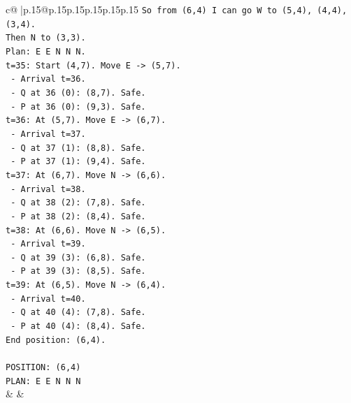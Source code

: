 \documentclass{article}
\begin{document}
{\begin{supertabular}{c@{$\;$}|p{.15\linewidth}@{}p{.15\linewidth}p{.15\linewidth}p{.15\linewidth}p{.15\linewidth}p{.15\linewidth}}
{{{\texttt{So from (6,4) I can go W to (5,4), (4,4), (3,4).} \\
\texttt{Then N to (3,3).} \\
\texttt{Plan: E E N N N.} \\
\texttt{t=35: Start (4,7). Move E {-}> (5,7).} \\
\texttt{  {-} Arrival t=36.} \\
\texttt{  {-} Q at 36 (0): (8,7). Safe.} \\
\texttt{  {-} P at 36 (0): (9,3). Safe.} \\
\texttt{t=36: At (5,7). Move E {-}> (6,7).} \\
\texttt{  {-} Arrival t=37.} \\
\texttt{  {-} Q at 37 (1): (8,8). Safe.} \\
\texttt{  {-} P at 37 (1): (9,4). Safe.} \\
\texttt{t=37: At (6,7). Move N {-}> (6,6).} \\
\texttt{  {-} Arrival t=38.} \\
\texttt{  {-} Q at 38 (2): (7,8). Safe.} \\
\texttt{  {-} P at 38 (2): (8,4). Safe.} \\
\texttt{t=38: At (6,6). Move N {-}> (6,5).} \\
\texttt{  {-} Arrival t=39.} \\
\texttt{  {-} Q at 39 (3): (6,8). Safe.} \\
\texttt{  {-} P at 39 (3): (8,5). Safe.} \\
\texttt{t=39: At (6,5). Move N {-}> (6,4).} \\
\texttt{  {-} Arrival t=40.} \\
\texttt{  {-} Q at 40 (4): (7,8). Safe.} \\
\texttt{  {-} P at 40 (4): (8,4). Safe.} \\
\texttt{End position: (6,4).} \\
\\ 
\texttt{POSITION: (6,4)} \\
\texttt{PLAN: E E N N N} \\
            }
        }
    }
    & & \\ \\


\end{supertabular}}
\end{document}
